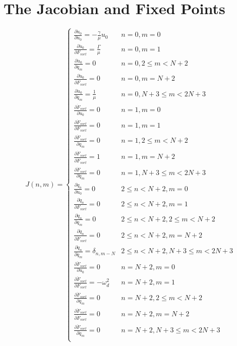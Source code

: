 \documentclass[superscriptaddress, onecolumn, prl]{revtex4}
\begin{document}
\section{The Jacobian and Fixed Points}
\begin{equation}
J(n,m) =
\begin{cases}
\frac{\partial \dot{u}_0}{\partial u_0} =-\frac{\gamma}{\mu} u_0 & n=0, m=0 \\
\frac{\partial \dot{u}_0}{\partial F_{vort}} = \frac{\Gamma}{\mu} & n=0, m=1 \\
\frac{\partial \dot{u}_0}{\partial q_m} = 0 & n=0, 2 \leq m < N + 2 \\
\frac{\partial \dot{u}_0}{\partial \dot{F}_{vort}} = 0 & n=0, m= N+2 \\
\frac{\partial \dot{u}_0}{\partial \dot{q}_m} = \frac{1}{\mu} & n=0, N + 3 \leq m < 2 N + 3 \\
\frac{\partial \dot{F}_{vort}}{\partial u_0}=0 & n=1, m=0 \\
\frac{\partial \dot{F}_{vort}}{\partial F_{vort}} = 0 & n=1, m=1 \\
\frac{\partial \dot{F}_{vort}}{\partial q_m} = 0 & n=1, 2 \leq m < N + 2 \\
\frac{\partial \dot{F}_{vort}}{\partial \dot{F}_{vort}} = 1 & n=1, m= N+2 \\
\frac{\partial \dot{F}_{vort}}{\partial \dot{q}_m} = 0 & n=1, N + 3 \leq m < 2 N + 3 \\ 
\frac{\partial \dot{q}_n}{\partial u_0} = 0 & 2 \leq n < N+2, m = 0 \\
\frac{\partial \dot{q}_n}{\partial F_{vort}} = 0 & 2 \leq n < N+2, m = 1 \\
\frac{\partial \dot{q}_n}{\partial q_m} = 0 & 2 \leq n < N+2, 2 \leq m < N+2 \\
\frac{\partial \dot{q}_n}{\partial \dot{F}_{vort}} = 0 & 2 \leq n < N+2, m = N+2 \\
\frac{\partial \dot{q}_n}{\partial \dot{q}_m} = \delta_{n,m-N} & 2 \leq n < N+2, N+3 \leq m < 2N+3 \\ 
\frac{\partial \ddot{F}_{vort}}{\partial u_0}=0 & n=N+2, m=0 \\
\frac{\partial \ddot{F}_{vort}}{\partial F_{vort}} = -\omega_d^2 & n=N+2, m=1 \\
\frac{\partial \ddot{F}_{vort}}{\partial q_m} = 0 & n=N+2, 2 \leq m < N + 2 \\
\frac{\partial \ddot{F}_{vort}}{\partial \dot{F}_{vort}} = 0 & n=N+2, m= N+2 \\
\frac{\partial \ddot{F}_{vort}}{\partial \dot{q}_m} = 0 & n=N+2, N + 3 \leq m < 2 N + 3 \\ 

\end{cases}
\end{equation}
\end{document}
